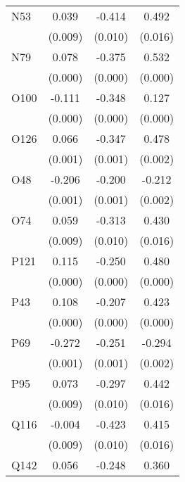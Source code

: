 \begin{table}[htbp]
\begin{tabular}{l*{3}{c}}
N53             &    0.039\sym{***}&   -0.414\sym{***}&    0.492\sym{***}\\
                &  (0.009)         &  (0.010)         &  (0.016)         \\
N79             &    0.078\sym{***}&   -0.375\sym{***}&    0.532\sym{***}\\
                &  (0.000)         &  (0.000)         &  (0.000)         \\
O100            &   -0.111\sym{***}&   -0.348\sym{***}&    0.127\sym{***}\\
                &  (0.000)         &  (0.000)         &  (0.000)         \\
O126            &    0.066\sym{***}&   -0.347\sym{***}&    0.478\sym{***}\\
                &  (0.001)         &  (0.001)         &  (0.002)         \\
O48             &   -0.206\sym{***}&   -0.200\sym{***}&   -0.212\sym{***}\\
                &  (0.001)         &  (0.001)         &  (0.002)         \\
O74             &    0.059\sym{***}&   -0.313\sym{***}&    0.430\sym{***}\\
                &  (0.009)         &  (0.010)         &  (0.016)         \\
P121            &    0.115\sym{***}&   -0.250\sym{***}&    0.480\sym{***}\\
                &  (0.000)         &  (0.000)         &  (0.000)         \\
P43             &    0.108\sym{***}&   -0.207\sym{***}&    0.423\sym{***}\\
                &  (0.000)         &  (0.000)         &  (0.000)         \\
P69             &   -0.272\sym{***}&   -0.251\sym{***}&   -0.294\sym{***}\\
                &  (0.001)         &  (0.001)         &  (0.002)         \\
P95             &    0.073\sym{***}&   -0.297\sym{***}&    0.442\sym{***}\\
                &  (0.009)         &  (0.010)         &  (0.016)         \\
Q116            &   -0.004         &   -0.423\sym{***}&    0.415\sym{***}\\
                &  (0.009)         &  (0.010)         &  (0.016)         \\
Q142            &    0.056\sym{***}&   -0.248\sym{***}&    0.360\sym{***}\\

\end{tabular}
\end{table}

